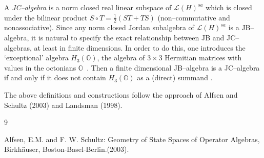 \documentclass[12pt]{article}
\theoremstyle{plain}
\theoremstyle{definition}
\numberwithin{equation}{section}
\newcommand{\med}{\medbreak}
\begin{document}
\bigbreak
\med

	A \emph{JC--algebra} is a norm closed real linear subspace of $\mathcal
L(H)^{sa}$ which is closed under the bilinear product 
$S \circ T = \frac{1}{2}(ST + TS)$ (non--commutative and nonassociative). Since any norm 
closed Jordan subalgebra of $\mathcal L(H)^{sa}$ is a JB--algebra, it is natural to specify 
the exact relationship between JB and JC--algebras, at least in finite dimensions. In order to 
do this, one introduces the `exceptional' algebra $H_3({\mathbb O})$, the algebra of $3 \times 
3$ Hermitian matrices with values in the octonians $\mathbb O$~. Then a finite dimensional JB--algebra is a 
JC--algebra if and only if it does not contain $H_3({\mathbb O})$ as a (direct) summand \cite{AS}. 


The above definitions and constructions follow the approach of Alfsen and Schultz (2003) and Landsman (1998).

\begin{thebibliography} {9}

Alfsen, E.M. and F. W. Schultz: Geometry of State Spaces of Operator Algebras, Birkh\"auser, Boston-Basel-Berlin.(2003). 

\end{thebibliography}

\end{document}
